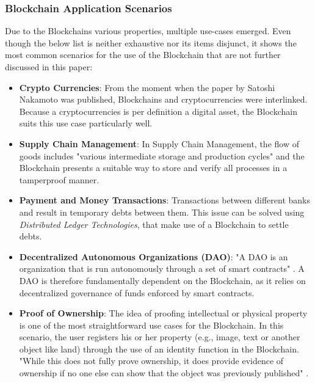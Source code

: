 \subsubsection{Blockchain Application Scenarios}
Due to the Blockchains various properties, multiple use-cases emerged. Even though the below list is neither exhaustive nor its items disjunct, it shows the most common scenarios for the use of the Blockchain \cite{Wust2017} that are not further discussed in this paper:
\begin{itemize}
  \item \textbf{Crypto Currencies}: From the moment when the paper by Satoshi Nakamoto \cite{Nakamoto2009} was published, Blockchains and cryptocurrencies were interlinked. Because a cryptocurrencies is per definition a digital asset, the Blockchain suits this use case particularly well.
  \item \textbf{Supply Chain Management}: In Supply Chain Management, the flow of goods includes "various intermediate storage and production cycles" \cite{Wust2017} and the Blockchain presents a suitable way to store and verify all processes in a tamperproof manner.
  \item \textbf{Payment and Money Transactions}: Transactions between different banks and result in temporary debts between them. This issue can be solved using \textit{Distributed Ledger Technologies}, that make use of a Blockchain to settle debts.
  \item \textbf{Decentralized Autonomous Organizations (DAO)}: "A DAO is an organization that is run autonomously through a set of smart contracts" \cite{Wust2017}. A DAO is therefore fundamentally dependent on the Blockchain, as it relies on decentralized governance of funds enforced by smart contracts.
  \item \textbf{Proof of Ownership}: The idea of proofing intellectual or physical property is one of the most straightforward use cases for the Blockchain. In this scenario, the user registers his or her property (e.g., image, text or another object like land) through the use of an identity function in the Blockchain. "While this does not fully prove ownership, it does provide evidence of ownership if no one else can show that the object was previously published" \cite{Wust2017}.
\end{itemize}

